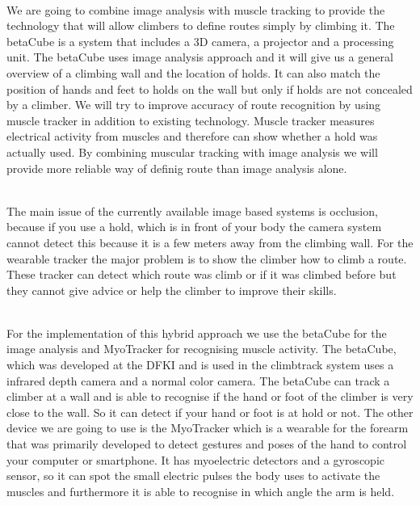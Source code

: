 \\
We are going to combine image analysis with muscle tracking to provide the technology that will allow climbers to define routes simply by climbing it.
The betaCube is a system that includes a 3D camera, a projector and a processing unit.
The betaCube uses image analysis approach and it will give us a general overview of a climbing wall and the location of holds.
It can also match the position of hands and feet to holds on the wall but only if holds are not concealed by a climber.
We will try to improve accuracy of route recognition by using muscle tracker in addition to existing technology.
Muscle tracker measures electrical activity from muscles and therefore can show whether a hold was actually used.
By combining muscular tracking with image analysis we will provide more reliable way of definig route than image analysis alone.

\\
The main issue of the currently available image based systems is occlusion, because if you use a hold, which is in front of your body the camera system cannot detect this because it is a few meters away from the climbing wall.
For the wearable tracker the major  problem is to show the climber how to climb a route.
These tracker can detect which route was climb or if it was climbed before but they cannot give advice or help the climber to improve their skills.

\\
For the implementation of this hybrid approach we use the betaCube for the image analysis and MyoTracker for recognising muscle activity.
The betaCube, which was developed at the DFKI and is used in the climbtrack system uses a infrared depth camera and a normal color camera. 
The betaCube can track a climber at a wall and is able to recognise if the hand or foot of the climber is very close to the wall.
So it can detect if your hand or foot is at hold or not.
The other device we are going to use is the MyoTracker which is a wearable for the forearm that was primarily developed to detect gestures and poses of the hand to control your computer or smartphone.
It has myoelectric detectors and a gyroscopic sensor, so it can spot the small electric pulses the body uses to activate the muscles and furthermore it is able to recognise in which angle the arm is held.

